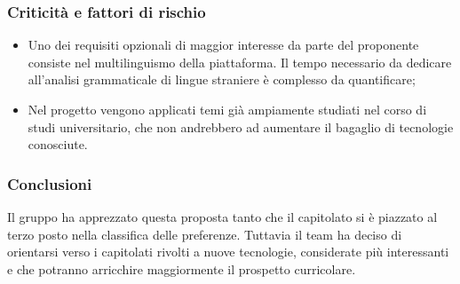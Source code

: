 \subsubsection{Criticità e fattori di rischio}
\begin{itemize}
	\item Uno dei requisiti opzionali di maggior interesse da parte del proponente consiste nel multilinguismo della piattaforma. Il tempo necessario da dedicare all'analisi grammaticale di lingue straniere è complesso da quantificare;
	\item Nel progetto vengono applicati temi già ampiamente studiati nel corso di studi universitario, che non andrebbero ad aumentare il bagaglio di tecnologie conosciute.
 	
\end{itemize}
\subsubsection{Conclusioni}
Il gruppo ha apprezzato questa proposta tanto che il capitolato si è piazzato al terzo posto nella classifica delle preferenze. Tuttavia il team ha deciso di orientarsi verso i capitolati rivolti a nuove tecnologie, considerate più interessanti e che potranno arricchire maggiormente il prospetto curricolare. 


